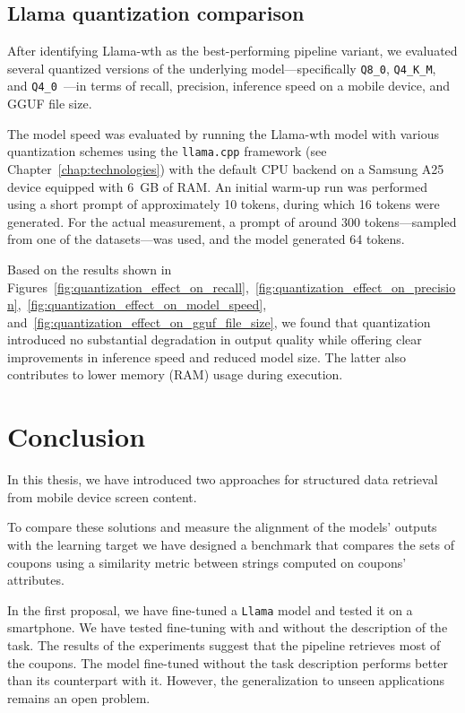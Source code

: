\documentclass[licencjacka,en]{pracamgr}
\begin{document}
\section{Llama quantization comparison}

After identifying Llama-wth as the best-performing pipeline variant, we evaluated several quantized versions of the underlying model—specifically \texttt{Q8\_0}, \texttt{Q4\_K\_M}, and \texttt{Q4\_0}~\cite{llama-cpp-quantization}—in terms of recall, precision, inference speed on a mobile device, and GGUF file size.

The model speed was evaluated by running the Llama-wth model with various quantization schemes using the \texttt{llama.cpp} framework (see Chapter~\ref{chap:technologies}) with the default CPU backend on a Samsung A25 device equipped with 6~GB of RAM. An initial warm-up run was performed using a short prompt of approximately 10 tokens, during which 16 tokens were generated. For the actual measurement, a prompt of around 300 tokens—sampled from one of the datasets—was used, and the model generated 64 tokens.

Based on the results shown in Figures~\ref{fig:quantization_effect_on_recall},~\ref{fig:quantization_effect_on_precision},~\ref{fig:quantization_effect_on_model_speed}, and~\ref{fig:quantization_effect_on_gguf_file_size}, we found that quantization introduced no substantial degradation in output quality while offering clear improvements in inference speed and reduced model size. The latter also contributes to lower memory (RAM) usage during execution.

\chapter{Conclusion} \label{chap:conclusion}
In this thesis, we have introduced two approaches for structured data retrieval from mobile device screen content.

To compare these solutions and measure the alignment of the models' outputs with the learning target we have designed a benchmark that compares the sets of coupons using a similarity metric between strings computed on coupons' attributes.

In the first proposal, we have fine-tuned a \texttt{Llama} model and tested it on a smartphone. We have tested fine-tuning with and without the description of the task. The results of the experiments suggest that the pipeline retrieves most of the coupons. The model fine-tuned without the task description performs better than its counterpart with it. However, the generalization to unseen applications remains an open problem.
\end{document}
